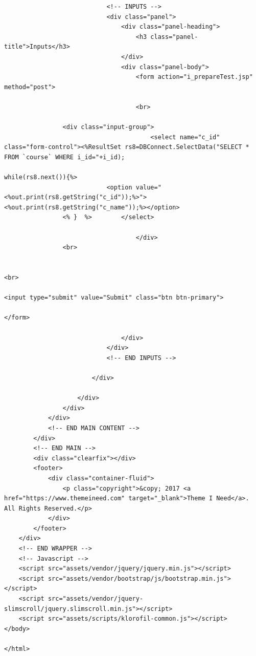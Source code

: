 \begin{lstlisting}
							<!-- INPUTS -->
							<div class="panel">
								<div class="panel-heading">
									<h3 class="panel-title">Inputs</h3>
								</div>
								<div class="panel-body">
									<form action="i_prepareTest.jsp" method="post">
									
									<br>
                                                                 
                <div class="input-group">
										<select name="c_id" class="form-control"><%ResultSet rs8=DBConnect.SelectData("SELECT * FROM `course` WHERE i_id="+i_id);
                                                                            while(rs8.next()){%>
                            <option value="<%out.print(rs8.getString("c_id"));%>"><%out.print(rs8.getString("c_name"));%></option>
                <% }  %>        </select>
										
									</div>
                <br>
                                                                       
                                                                        <br>
                                                                        <input type="submit" value="Submit" class="btn btn-primary">
                                                                        </form>
								
								</div>
							</div>
							<!-- END INPUTS -->
						
						</div>
						
					</div>
				</div>
			</div>
			<!-- END MAIN CONTENT -->
		</div>
		<!-- END MAIN -->
		<div class="clearfix"></div>
		<footer>
			<div class="container-fluid">
				<p class="copyright">&copy; 2017 <a href="https://www.themeineed.com" target="_blank">Theme I Need</a>. All Rights Reserved.</p>
			</div>
		</footer>
	</div>
	<!-- END WRAPPER -->
	<!-- Javascript -->
	<script src="assets/vendor/jquery/jquery.min.js"></script>
	<script src="assets/vendor/bootstrap/js/bootstrap.min.js"></script>
	<script src="assets/vendor/jquery-slimscroll/jquery.slimscroll.min.js"></script>
	<script src="assets/scripts/klorofil-common.js"></script>
</body>

</html>

\end{lstlisting}

